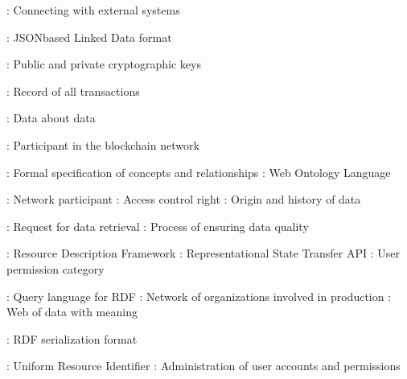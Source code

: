\documentclass[letterpaper,10pt,english]{sphinxmanual}
\begin{document}
\sphinxAtStartPar
{}
\sphinxhyphen{} : Connecting with external systems

\sphinxAtStartPar
{}
\sphinxhyphen{} : JSON\sphinxhyphen{}based Linked Data format

\sphinxAtStartPar
{}
\sphinxhyphen{} : Public and private cryptographic keys

\sphinxAtStartPar
{}
\sphinxhyphen{} : Record of all transactions

\sphinxAtStartPar
{}
\sphinxhyphen{} : Data about data

\sphinxAtStartPar
{}
\sphinxhyphen{} : Participant in the blockchain network

\sphinxAtStartPar
{}
\sphinxhyphen{} : Formal specification of concepts and relationships
\sphinxhyphen{} : Web Ontology Language

\sphinxAtStartPar
{}
\sphinxhyphen{} : Network participant
\sphinxhyphen{} : Access control right
\sphinxhyphen{} : Origin and history of data

\sphinxAtStartPar
{}
\sphinxhyphen{} : Request for data retrieval
\sphinxhyphen{} : Process of ensuring data quality

\sphinxAtStartPar
{}
\sphinxhyphen{} : Resource Description Framework
\sphinxhyphen{} : Representational State Transfer API
\sphinxhyphen{} : User permission category

\sphinxAtStartPar
{}
\sphinxhyphen{} : Query language for RDF
\sphinxhyphen{} : Network of organizations involved in production
\sphinxhyphen{} : Web of data with meaning

\sphinxAtStartPar
{}
\sphinxhyphen{} : RDF serialization format

\sphinxAtStartPar
{}
\sphinxhyphen{} : Uniform Resource Identifier
\sphinxhyphen{} : Administration of user accounts and permissions
\end{document}
